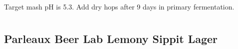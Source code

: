 \documentclass[10pt,oneside]{scrbook}
\begin{document}

\begin{methodandtiming}
 
\begin{mashsteps}
\end{mashsteps}

\begin{directions}
Target mash pH is 5.3. Add dry hops after 9 days in primary fermentation.
\end{directions}

\end{methodandtiming}

\pagebreak

\begin{ingredientsblock}

\begin{malts}
\end{malts}

\begin{hops}
\end{hops}

\begin{yeasts}
\end{yeasts}

\end{ingredientsblock}

\backmatter

\part{\styleamericanlager}

\chapter*{Parleaux Beer Lab Lemony Sippit Lager}
\end{document}
